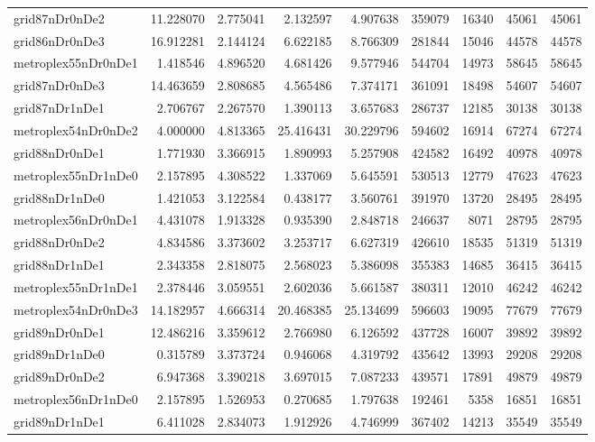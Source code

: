 \documentclass[../../../thesis.tex]{subfiles}
\begin{document}
\begin{longtable}{|l|r|r|r|r|r|r|r|r|}
grid87nDr0nDe2 & 11.228070 & 2.775041 & 2.132597 & 4.907638 & 359079 & 16340 & 45061 & 45061 \\
grid86nDr0nDe3 & 16.912281 & 2.144124 & 6.622185 & 8.766309 & 281844 & 15046 & 44578 & 44578 \\
metroplex55nDr0nDe1 & 1.418546 & 4.896520 & 4.681426 & 9.577946 & 544704 & 14973 & 58645 & 58645 \\
grid87nDr0nDe3 & 14.463659 & 2.808685 & 4.565486 & 7.374171 & 361091 & 18498 & 54607 & 54607 \\
grid87nDr1nDe1 & 2.706767 & 2.267570 & 1.390113 & 3.657683 & 286737 & 12185 & 30138 & 30138 \\
metroplex54nDr0nDe2 & 4.000000 & 4.813365 & 25.416431 & 30.229796 & 594602 & 16914 & 67274 & 67274 \\
grid88nDr0nDe1 & 1.771930 & 3.366915 & 1.890993 & 5.257908 & 424582 & 16492 & 40978 & 40978 \\
metroplex55nDr1nDe0 & 2.157895 & 4.308522 & 1.337069 & 5.645591 & 530513 & 12779 & 47623 & 47623 \\
grid88nDr1nDe0 & 1.421053 & 3.122584 & 0.438177 & 3.560761 & 391970 & 13720 & 28495 & 28495 \\
metroplex56nDr0nDe1 & 4.431078 & 1.913328 & 0.935390 & 2.848718 & 246637 & 8071 & 28795 & 28795 \\
grid88nDr0nDe2 & 4.834586 & 3.373602 & 3.253717 & 6.627319 & 426610 & 18535 & 51319 & 51319 \\
grid88nDr1nDe1 & 2.343358 & 2.818075 & 2.568023 & 5.386098 & 355383 & 14685 & 36415 & 36415 \\
metroplex55nDr1nDe1 & 2.378446 & 3.059551 & 2.602036 & 5.661587 & 380311 & 12010 & 46242 & 46242 \\
metroplex54nDr0nDe3 & 14.182957 & 4.666314 & 20.468385 & 25.134699 & 596603 & 19095 & 77679 & 77679 \\
grid89nDr0nDe1 & 12.486216 & 3.359612 & 2.766980 & 6.126592 & 437728 & 16007 & 39892 & 39892 \\
grid89nDr1nDe0 & 0.315789 & 3.373724 & 0.946068 & 4.319792 & 435642 & 13993 & 29208 & 29208 \\
grid89nDr0nDe2 & 6.947368 & 3.390218 & 3.697015 & 7.087233 & 439571 & 17891 & 49879 & 49879 \\
metroplex56nDr1nDe0 & 2.157895 & 1.526953 & 0.270685 & 1.797638 & 192461 & 5358 & 16851 & 16851 \\
grid89nDr1nDe1 & 6.411028 & 2.834073 & 1.912926 & 4.746999 & 367402 & 14213 & 35549 & 35549 \\

\end{longtable}
\end{document}
